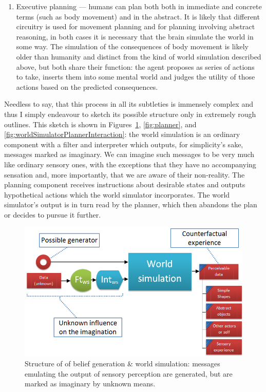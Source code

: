 \begin{enumerate}
	
	\item Executive planning --- humans can plan both both in immediate and concrete terms (such as body movement) and in the abstract. It is likely that different circuitry is used for movement planning and for planning involving abstract reasoning, in both cases it is necessary that the brain simulate the world in some way. The simulation of the consequences of body movement is likely older than humanity and distinct from the kind of world simulation described above, but both share their function: the agent proposes as series of actions to take, inserts them into some mental world and judges the utility of those actions based on the predicted consequences.
\end{enumerate}

Needless to say, that this process in all its subtleties is immensely complex and thus I simply endeavour to sketch its possible structure only in extremely rough outlines. This sketch is shown in Figures~\ref{fig:imagination},  \ref{fig:planner}, and \ref{fig:worldSimulatorPlannerInteraction}: the world simulation is an ordinary component with a filter and interpreter which outputs, for simplicity's sake, messages marked as imaginary. We can imagine such messages to be very much like ordinary sensory ones, with the exceptions that they have no accompanying sensation and, more importantly, that we are aware of their non-reality. The planning component receives instructions about desirable states and outputs hypothetical actions which the world simulator incorporates. The world simulator's output is in turn read by the planner, which then abandons the plan or decides to pursue it further.

\begin{figure}
	\centering
	\includegraphics[width=\textwidth]{figs/imagination.png}
	\caption{Structure of of belief generation \& world simulation: messages emulating the output of sensory perception are generated, but are marked as imaginary by unknown means.}
	\label{fig:imagination}
\end{figure}

